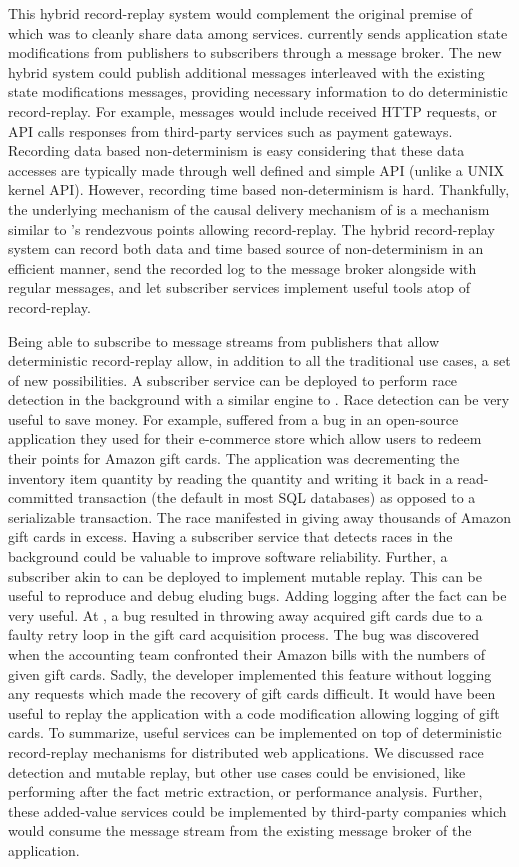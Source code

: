 This hybrid record-replay system would complement the original premise of
\synapse which was to cleanly share data among services. \synapse currently
sends application state modifications from publishers to subscribers through a
message broker. The new hybrid system could publish additional messages
interleaved with the existing state modifications messages, providing necessary
information to do deterministic record-replay. For example, messages would include
received HTTP requests, or API calls responses from third-party services such as
payment gateways. Recording data based non-determinism is easy considering that
these data accesses are typically made through well defined and simple API
(unlike a UNIX kernel API). However, recording time based non-determinism is hard.
Thankfully, the underlying mechanism of the causal delivery mechanism of \synapse
is a mechanism similar to \scribe's rendezvous points allowing record-replay.
The hybrid record-replay system can record both data and time based source
of non-determinism in an efficient manner, send the recorded log to the message
broker alongside with regular \synapse messages, and let subscriber services
implement useful tools atop of record-replay.

Being able to subscribe to message streams from publishers that allow
deterministic record-replay allow, in addition to all the traditional \synapse
use cases, a set of new possibilities. A subscriber service can be deployed to
perform race detection in the background with a similar engine to \racepro.
Race detection can be very useful to save money. For example, \crowdtap suffered
from a bug in an open-source application they used for their e-commerce store
which allow users to redeem their points for Amazon gift cards.  The application
was decrementing the inventory item quantity by reading the quantity and writing
it back in a read-committed transaction (the default in most SQL databases) as
opposed to a serializable transaction. The race manifested in giving away
thousands of Amazon gift cards in excess. Having a subscriber service that
detects races in the background could be valuable to improve software
reliability.
Further, a subscriber akin to \dora can be deployed to implement mutable replay.
This can be useful to reproduce and debug eluding bugs. Adding logging after the
fact can be very useful. At \crowdtap, a bug resulted in throwing away acquired
gift cards due to a faulty retry loop in the gift card acquisition process.
The bug was discovered when the accounting team confronted their Amazon bills
with the numbers of given gift cards. Sadly, the developer implemented this
feature without logging any requests which made the recovery of gift cards
difficult. It would have been useful to replay the application with a code
modification allowing logging of gift cards.
To summarize, useful services can be implemented on top of deterministic
record-replay mechanisms for distributed web applications. We discussed race detection
and mutable replay, but other use cases could be envisioned, like performing
after the fact metric extraction, or performance analysis.
Further, these added-value services could be implemented by third-party
companies which would consume the message stream from the existing \synapse
message broker of the application.

